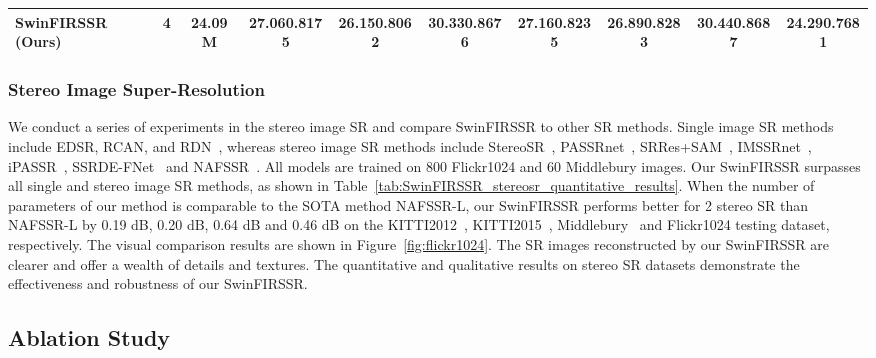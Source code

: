\documentclass[10pt,twocolumn,letterpaper]{article}
\begin{document}
\begin{table*}[!t]
{\begin{tabular}{lccccccccc}
			\textbf{SwinFIRSSR} (Ours) & 4 & 24.09M  & {27.06}{0.8175} & {26.15}{0.8062} & {30.33}{0.8676} & {27.16}{0.8235} & {26.89}{0.8283} & {30.44}{0.8687} & {24.29}{0.7681} \\
			\bottomrule
	\end{tabular}}
 \caption{Quantitative results achieved by different methods on the KITTI 2012~\cite{geiger2012we}, KITTI 2015~\cite{menze2015object}, Middlebury~\cite{scharstein2014high}, and Flickr1024~\cite{wang2019learning} datasets on the RGB space for \textbf{stereo image SR}.  represents the number of parameters of the networks. 
		Here, PSNRSSIM values achieved on both the left images (i.e., \textit{Left}) and a pair of stereo images (i.e., ) are reported. } 
	\label{tab:SwinFIRSSR_stereosr_quantitative_results}
\end{table*} 



\subsubsection{Stereo Image Super-Resolution}


We conduct a series of experiments in the stereo image SR and compare SwinFIRSSR to other SR methods. Single image SR methods include EDSR, RCAN, and RDN~\cite{2018Residual}, whereas stereo image SR methods include StereoSR~\cite{2018Enhancing}, PASSRnet~\cite{2019Learning}, SRRes+SAM~\cite{2020A}, IMSSRnet~\cite{lei2020deep}, iPASSR~\cite{2020Deep}, SSRDE-FNet~\cite{2021Feedback} and NAFSSR~\cite{chu2022nafssr}. 
All models are trained on 800 Flickr1024 and 60 Middlebury images. 
Our SwinFIRSSR surpasses all single and stereo image SR methods, as shown in Table~\ref{tab:SwinFIRSSR_stereosr_quantitative_results}. When the number of parameters of our method is comparable to the SOTA method NAFSSR-L, our SwinFIRSSR performs better for 2 stereo SR than NAFSSR-L by 0.19 dB, 0.20 dB, 0.64 dB and 0.46 dB on the KITTI2012~\cite{geiger2012we}, KITTI2015~\cite{menze2015object}, Middlebury~\cite{scharstein2014high} and Flickr1024 testing dataset, respectively. 
The visual comparison results are shown in Figure~\ref{fig:flickr1024}. The SR images reconstructed by our SwinFIRSSR are clearer and offer a wealth of details and textures. 
The quantitative and qualitative results on stereo SR datasets demonstrate the effectiveness and robustness of our SwinFIRSSR.





\subsection{Ablation Study}
\end{document}
